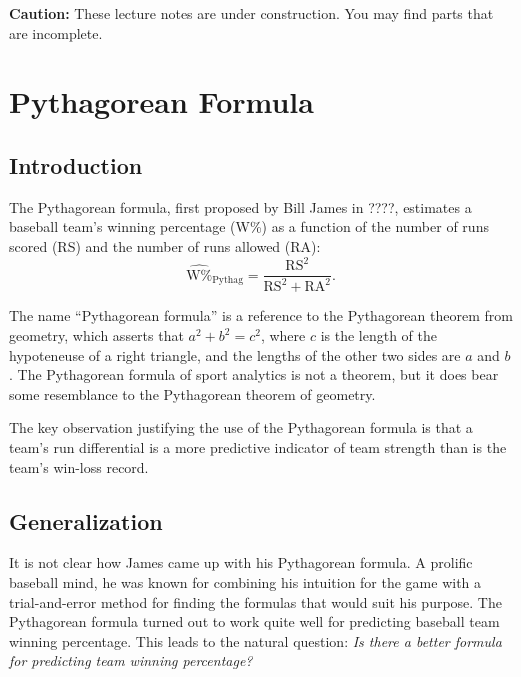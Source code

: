 \documentclass{article}
\begin{document}
\begin{framed}
  {\bf Caution:} These lecture notes are under construction. You may find parts that are incomplete.
\end{framed}

\setcounter{section}{1}
\section{\sc Pythagorean Formula}

\subsection{\sc Introduction}

The Pythagorean formula, first proposed by Bill James in ????, estimates a baseball team's winning percentage (W\%) as a function of the number of runs scored (RS) and the number of runs allowed (RA):
$$
  \hat{\mbox{W\%}}_{\mbox{Pythag}} = \frac{\mbox{RS}^2}{\mbox{RS}^2 + \mbox{RA}^2}.
$$

The name ``Pythagorean formula'' is a reference to the Pythagorean theorem from geometry, which asserts that $a^2 + b^2 = c^2$, where $c$ is the length of the hypoteneuse of a right triangle, and the lengths of the other two sides are $a$ and $b$. The Pythagorean formula of sport analytics is not a theorem, but it does bear some resemblance to the Pythagorean theorem of geometry.

The key observation justifying the use of the Pythagorean formula is that a team's run differential is a more predictive indicator of team strength than is the team's win-loss record.

\subsection{\sc Generalization}

It is not clear how James came up with his Pythagorean formula. A prolific baseball mind, he was known for combining his intuition for the game with a trial-and-error method for finding the formulas that would suit his purpose. The Pythagorean formula turned out to work quite well for predicting baseball team winning percentage. This leads to the natural question: {\it Is there a better formula for predicting team winning percentage?}
\end{document}
